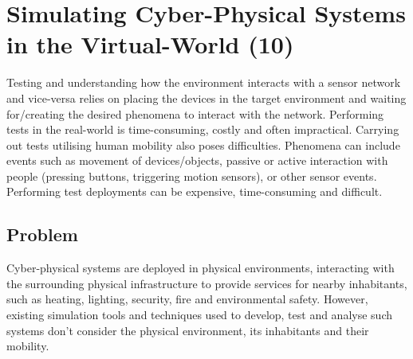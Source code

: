\chapter{Simulating Cyber-Physical Systems in the Virtual-World (10)}

Testing and understanding how the environment interacts with a sensor network and vice-versa relies on placing the devices in the target environment and waiting for/creating the desired phenomena to interact with the network. Performing tests in the real-world is time-consuming, costly and often impractical. Carrying out tests utilising human mobility also poses difficulties. Phenomena can include events such as movement of devices/objects, passive or active interaction with people (pressing buttons, triggering motion sensors), or other sensor events. Performing test deployments can be expensive, time-consuming and difficult.



\section{Problem} %
\label{sec:problem}
Cyber-physical systems are deployed in physical environments, interacting with the surrounding physical infrastructure to provide services for nearby inhabitants, such as heating, lighting, security, fire and environmental safety. However, existing simulation tools and techniques used to develop, test and analyse such systems don't consider the physical environment, its inhabitants and their mobility. 
 

